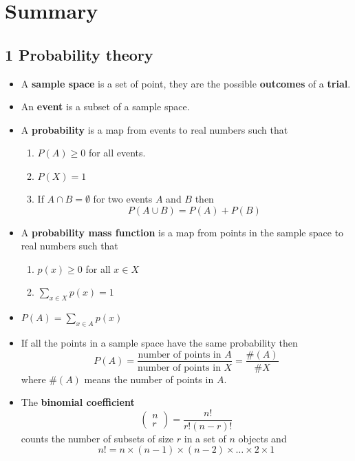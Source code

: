 
\ifind
\section*{Summary}
\else
\subsection*{1 Probability theory}
\fi

\begin{itemize}
\item A \textbf{sample space} is a set of point, they are the possible \textbf{outcomes} of a \textbf{trial}.
\item An \textbf{event} is a subset of a sample space.
\item A \textbf{probability} is a map from events to real numbers such that
  \begin{enumerate}
    \item $P(A)\ge 0$ for all events.
    \item $P(X)=1$
    \item If $A\cap B=\emptyset$ for two events $A$ and $B$ then 
      \begin{equation}
        P(A\cup B)=P(A)+P(B)
      \end{equation}
\end{enumerate}
\item A \textbf{probability mass function} is a map from points in the sample space to real numbers such that
  \begin{enumerate}
\item $p(x)\ge 0$ for all $x\in X$
\item $\sum_{x\in X} p(x)=1$
  \end{enumerate}
\item $P(A)=\sum_{x\in A}p(x)$
\item If all the points in a sample space have the same probability then
  \begin{equation}
P(A)=\frac{\mbox{number of points in }A}{\mbox{number of points in }X}=\frac{\#(A)}{\#{X}}
  \end{equation}
  where $\#(A)$ means the number of points in $A$.
  \item The \textbf{binomial coefficient}
\begin{equation}
\left(\begin{array}{c}n\\r\end{array}\right)=\frac{n!}{r!(n-r)!}
\end{equation}
counts the number of subsets of size $r$ in a set of $n$ objects and 
\begin{equation}
n!=n\times (n-1)\times (n-2)\times \ldots \times 2 \times 1
\end{equation}
\end{itemize}

